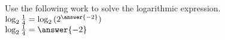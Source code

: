 \documentclass{ximera}
\author{David Kish}
\begin{document}
\begin{exercise}
Use the following work to solve the logarithmic expression.\\
$ \log_2{\frac{1}{4}}=\log_2{(2^{\answer{-2}})}$\\
$ \log_2{\frac{1}{4}}=\answer{-2}$
\end{exercise}
\end{document}
